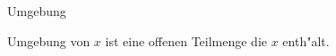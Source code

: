 \documentclass[class=article, crop=false]{standalone}
\begin{document}
\begin{zettel}{Umgebung}
\begin{flashcard}[]{}
	\begin{definition}[Umgebung]
		Umgebung von $x$ ist eine offenen Teilmenge die $x$ enth"alt.
	\end{definition}
\end{flashcard}
\end{zettel}
\end{document}
